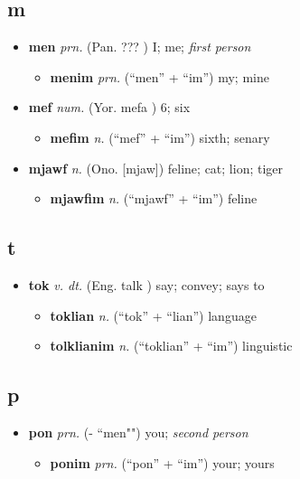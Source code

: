 \subsection{m}
\begin{itemize}
	\item \textbf{men} \textit{prn.} (Pan. \lang ??? \rang [mɛ̃]) I; me; \textit{first person}
	\begin{itemize}
		\item \textbf{menim} \textit{prn.} (``men'' + ``im'') my; mine
	\end{itemize}

	\item \textbf{mef} \textit{num.} (Yor. \lang mefa \rang [mefa]) 6; six
	\begin{itemize}
		\item \textbf{mefim} \textit{n.} (``mef'' + ``im'') sixth; senary
	\end{itemize}

	\item \textbf{mjawf} \textit{n.} (Ono. [mjaw]) feline; cat; lion; tiger
	\begin{itemize}
		\item \textbf{mjawfim} \textit{n.} (``mjawf'' + ``im'') feline
	\end{itemize}

\end{itemize}

\subsection{t}
\begin{itemize}

	\item \textbf{tok} \textit{v. dt.} (Eng. \lang talk \rang [tʰɑlk]) say; convey;  says  to 
	\begin{itemize}
		\item \textbf{toklian} \textit{n.} (``tok'' + ``lian'') language
		\item \textbf{tolklianim} \textit{n.} (``toklian'' + ``im'') linguistic
	\end{itemize}

\end{itemize}

\subsection{p}
\begin{itemize}

	\item \textbf{pon} \textit{prn.} (- ``men"") you; \textit{second person}
	\begin{itemize}
		\item \textbf{ponim} \textit{prn.} (``pon'' + ``im'') your; yours
	\end{itemize}

\end{itemize}

